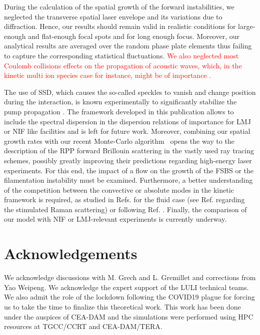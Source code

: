 \documentclass[
 reprint,
 superscriptaddress,
 amsmath,amssymb,
 aps,
]{revtex4-1}
\def\tc{\textcolor{red}}
\begin{document}
During the calculation of the spatial growth of the forward instabilities, we neglected the transverse spatial laser envelope and its variations due to diffraction. Hence, our results should remain valid in realistic conditions for large-enough and flat-enough focal spots and for long enough focus. Moreover,  our analytical results are averaged over the random phase plate elements thus failing to capture the corresponding statistical fluctuations. 
\tc{
We also neglected most Coulomb collisions effects on the propagation of acoustic waves, which, in the kinetic multi ion species case for instance,  might be of importance  \cite[]{POP_Berger_2005b}. 
}

The use of SSD, which  causes the so-called speckles to vanish and change position during the interaction, is known  experimentally to significantly stabilize the pump propagation \cite[]{Berger_1995}. The framework developed in this publication allows to include the spectral dispersion in the dispersion relations of importance for LMJ or NIF like facilities  and is left for future work. Moreover, 
combining our spatial growth rates with our recent Monte-Carlo algorithm~\cite[]{POP_Debayle_2019}  opens the way to the description of the RPP forward Brillouin scattering   in the vastly used ray tracing schemes, possibly greatly improving their predictions regarding high-energy laser experiments. For this end, the impact of a flow on the growth of the FSBS or the filamentation instability must be examined. 
Furthermore, a better  understanding of the competition between the convective or absolute modes in the kinetic framework is required,   as studied  in Refs. \cite[]{phd-Grech,PRL_Grech_2009} for the fluid case  (see Ref. \cite[]{POP_Grismayer_2004}  regarding the stimulated Raman scattering) or  following   Ref. \cite[]{PR_Hall_68}.
Finally, the comparison of our model with NIF or LMJ-relevant experiments is currently underway. 

\section*{Acknowledgements}
We acknowledge  discussions with M. Grech and L. Gremillet and corrections from Yao Weipeng. We acknowledge the expert support of the LULI technical teams. We also admit the role of the lockdown following the COVID19 plague for forcing us to take the time to finalize this theoretical work. This work has been done under the auspices of CEA-DAM  and the simulations were performed using HPC resources at TGCC/CCRT and CEA-DAM/TERA.
\end{document}
